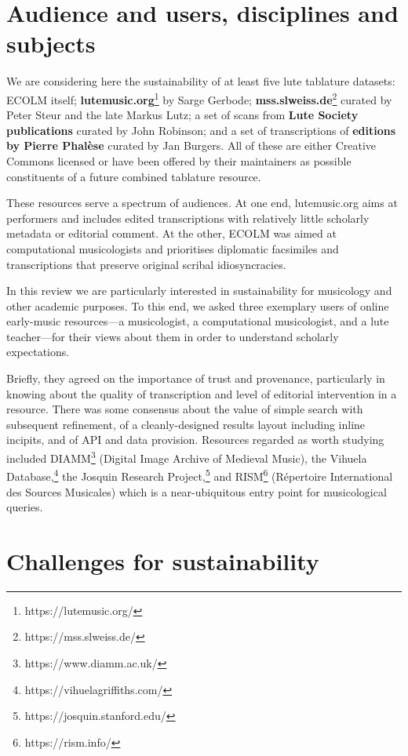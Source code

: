 \documentclass[sigconf, nonacm=true]{acmart}
\begin{document}
\begin{sloppypar}
  \section{Audience and users, disciplines and subjects}\label{audience}

  We are considering here the sustainability of at least five lute
  tablature datasets: ECOLM itself; {\bf
    lutemusic.org}\footnote{https://lutemusic.org/} by Sarge Gerbode;
  {\bf mss.slweiss.de}\footnote{https://mss.slweiss.de/} curated by
  Peter Steur and the late Markus Lutz; a set of scans from {\bf Lute
    Society publications} curated by John Robinson; and a set of
  transcriptions of {\bf editions by Pierre Phal\`ese} curated by Jan
  Burgers. All of these are either Creative Commons licensed or have
  been offered by their maintainers as possible constituents of a
  future combined tablature resource.

  These resources serve a spectrum of audiences. At one end,
  lutemusic.org aims at performers and includes edited transcriptions
  with relatively little scholarly metadata or editorial comment. At
  the other, ECOLM was aimed at computational musicologists and
  prioritises diplomatic facsimiles and transcriptions that preserve
  original scribal idiosyncracies.

  In this review we are particularly interested in sustainability for
  musicology and other academic purposes. To this end, we asked three
  exemplary users of online early-music resources---a musicologist, a
  computational musicologist, and a lute teacher---for their views
  about them in order to understand scholarly expectations.

  Briefly, they agreed on the importance of trust and provenance,
  particularly in knowing about the quality of transcription and level
  of editorial intervention in a resource. There was some consensus
  about the value of simple search with subsequent refinement, of a
  cleanly-designed results layout including inline incipits, and of
  API and data provision. Resources regarded as worth studying
  included DIAMM\footnote{https://www.diamm.ac.uk/} (Digital Image
  Archive of Medieval Music), the Vihuela
  Database,\footnote{https://vihuelagriffiths.com/} the Josquin
  Research Project,\footnote{https://josquin.stanford.edu/} and
  RISM\footnote{https://rism.info/} (R\'epertoire International des
  Sources Musicales) which is a near-ubiquitous entry point for
  musicological queries.
  
  \section{Challenges for sustainability}\label{challenges}


\end{sloppypar}
\end{document}
